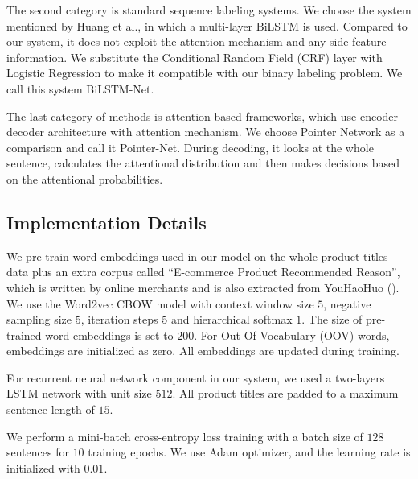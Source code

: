 The second category is standard sequence labeling systems. 
We choose the system mentioned by 
Huang et al.,
in which a multi-layer BiLSTM is used.
Compared to our system, it does not exploit the attention mechanism and 
any side feature information.
We substitute the Conditional Random Field (CRF) layer with 
Logistic Regression to make it compatible with our binary labeling problem.
We call this system BiLSTM-Net.

The last category of methods is attention-based frameworks, 
which use encoder-decoder architecture with attention mechanism.
We choose Pointer Network \cite{vinyals2015pointer} as a comparison and 
call it Pointer-Net.
During decoding, it looks at the whole sentence, calculates the attentional 
distribution and then makes decisions based on the attentional probabilities.
 

\subsection{Implementation Details}
We pre-train word embeddings used in our model 
on the whole product titles data plus an extra corpus called 
``E-commerce Product Recommended Reason'',
which is written by online merchants and is also extracted from YouHaoHuo
().
We use the Word2vec \cite{mikolov2013efficient,mikolov2013distributed} 
CBOW model with context window size $5$, negative sampling size $5$, 
iteration steps $5$ and hierarchical softmax $1$. 
The size of pre-trained word embeddings is set to $200$. 
For Out-Of-Vocabulary (OOV) words, embeddings are initialized as zero.
All embeddings are updated during training. 

For recurrent neural network component in our system, 
we used a two-layers LSTM network with unit size $512$.
All product titles are padded to a maximum sentence length of $15$.

We perform a mini-batch cross-entropy loss training with a batch size 
of $128$ sentences for $10$ training epochs.  We use Adam optimizer, 
and the learning rate is initialized with $0.01$.

